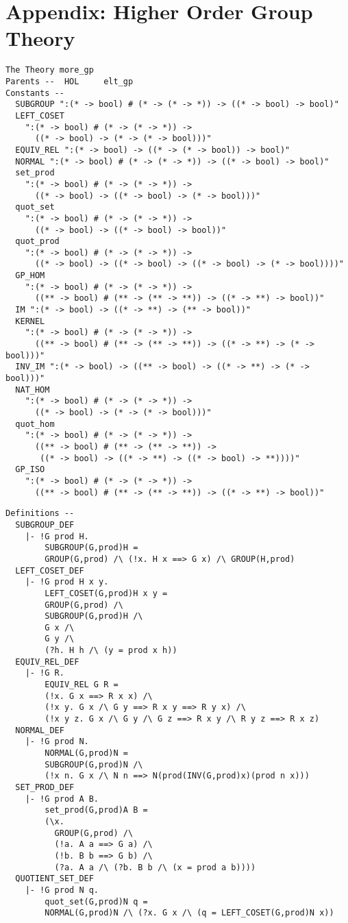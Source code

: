 \section{Appendix: Higher Order Group Theory}
\begin{verbatim}
The Theory more_gp
Parents --  HOL     elt_gp     
Constants --
  SUBGROUP ":(* -> bool) # (* -> (* -> *)) -> ((* -> bool) -> bool)"
  LEFT_COSET
    ":(* -> bool) # (* -> (* -> *)) ->
      ((* -> bool) -> (* -> (* -> bool)))"
  EQUIV_REL ":(* -> bool) -> ((* -> (* -> bool)) -> bool)"
  NORMAL ":(* -> bool) # (* -> (* -> *)) -> ((* -> bool) -> bool)"
  set_prod
    ":(* -> bool) # (* -> (* -> *)) ->
      ((* -> bool) -> ((* -> bool) -> (* -> bool)))"
  quot_set
    ":(* -> bool) # (* -> (* -> *)) ->
      ((* -> bool) -> ((* -> bool) -> bool))"
  quot_prod
    ":(* -> bool) # (* -> (* -> *)) ->
      ((* -> bool) -> ((* -> bool) -> ((* -> bool) -> (* -> bool))))"
  GP_HOM
    ":(* -> bool) # (* -> (* -> *)) ->
      ((** -> bool) # (** -> (** -> **)) -> ((* -> **) -> bool))"
  IM ":(* -> bool) -> ((* -> **) -> (** -> bool))"
  KERNEL
    ":(* -> bool) # (* -> (* -> *)) ->
      ((** -> bool) # (** -> (** -> **)) -> ((* -> **) -> (* -> bool)))"
  INV_IM ":(* -> bool) -> ((** -> bool) -> ((* -> **) -> (* -> bool)))"
  NAT_HOM
    ":(* -> bool) # (* -> (* -> *)) ->
      ((* -> bool) -> (* -> (* -> bool)))"
  quot_hom
    ":(* -> bool) # (* -> (* -> *)) ->
      ((** -> bool) # (** -> (** -> **)) ->
       ((* -> bool) -> ((* -> **) -> ((* -> bool) -> **))))"
  GP_ISO
    ":(* -> bool) # (* -> (* -> *)) ->
      ((** -> bool) # (** -> (** -> **)) -> ((* -> **) -> bool))"     
\end{verbatim}
\newpage
\begin{verbatim}
Definitions --
  SUBGROUP_DEF
    |- !G prod H.
        SUBGROUP(G,prod)H =
        GROUP(G,prod) /\ (!x. H x ==> G x) /\ GROUP(H,prod)
  LEFT_COSET_DEF
    |- !G prod H x y.
        LEFT_COSET(G,prod)H x y =
        GROUP(G,prod) /\
        SUBGROUP(G,prod)H /\
        G x /\
        G y /\
        (?h. H h /\ (y = prod x h))
  EQUIV_REL_DEF
    |- !G R.
        EQUIV_REL G R =
        (!x. G x ==> R x x) /\
        (!x y. G x /\ G y ==> R x y ==> R y x) /\
        (!x y z. G x /\ G y /\ G z ==> R x y /\ R y z ==> R x z)
  NORMAL_DEF
    |- !G prod N.
        NORMAL(G,prod)N =
        SUBGROUP(G,prod)N /\
        (!x n. G x /\ N n ==> N(prod(INV(G,prod)x)(prod n x)))
  SET_PROD_DEF
    |- !G prod A B.
        set_prod(G,prod)A B =
        (\x.
          GROUP(G,prod) /\
          (!a. A a ==> G a) /\
          (!b. B b ==> G b) /\
          (?a. A a /\ (?b. B b /\ (x = prod a b))))
  QUOTIENT_SET_DEF
    |- !G prod N q.
        quot_set(G,prod)N q =
        NORMAL(G,prod)N /\ (?x. G x /\ (q = LEFT_COSET(G,prod)N x))
\end{verbatim}
